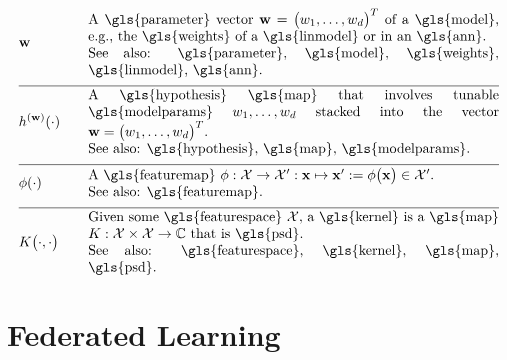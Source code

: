 \begin{align} 
	&\weights  &\quad & \parbox{.85\textwidth}{A \gls{parameter} vector $\weights = \big(\weight_{1},\ldots,\weight_{\featuredim}\big)^{T}$ 
		of a \gls{model}, e.g., the \gls{weights} of a \gls{linmodel} or in an \gls{ann}.
		\\ See also: \gls{parameter}, \gls{model}, \gls{weights}, \gls{linmodel}, \gls{ann}. }     \nonumber \\[2mm] \hline \nonumber\\[-5mm]
	&\hypothesis^{(\weights)}(\cdot)  &\quad &\parbox{.85\textwidth}{A \gls{hypothesis} \gls{map} that involves tunable \gls{modelparams} 
		$\weight_{1},\ldots,\weight_{\featuredim}$ stacked into the vector $\weights=\big(\weight_{1},\ldots,\weight_{\featuredim} \big)^{T}$.
		\\ See also: \gls{hypothesis}, \gls{map}, \gls{modelparams}. } \nonumber \\[2mm] \hline \nonumber\\[-5mm]
	&\featuremap(\cdot)  &\quad & \parbox{.85\textwidth}{A \gls{featuremap} 
		$\featuremap: \featurespace \rightarrow \featurespace' : \featurevec \mapsto \featurevec' \defeq \featuremap\big( \featurevec \big) \in \featurespace'$.
		\\ See also: \gls{featuremap}. }   \nonumber \\[2mm] \hline \nonumber\\[-5mm]
	&\kernelmap{\cdot}{\cdot} &\quad & \parbox{.85\textwidth}{Given some \gls{featurespace} $\featurespace$, 
		a \gls{kernel} is a \gls{map} $\kernel: \featurespace \times \featurespace \rightarrow \mathbb{C}$ that is \gls{psd}.
		\\ See also: \gls{featurespace}, \gls{kernel}, \gls{map}, \gls{psd}. }    \nonumber                                                                                                                                                     
\end{align}              






\newpage
\section*{Federated Learning}

